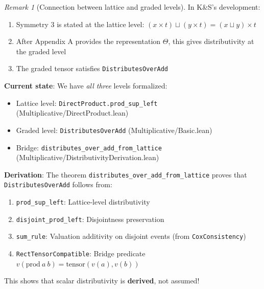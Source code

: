 \documentclass[11pt]{article}
\theoremstyle{definition}
\theoremstyle{remark}
\newtheorem{remark}[theorem]{Remark}
\begin{document}
\begin{remark}[Connection between lattice and graded levels]
In K\&S's development:
\begin{enumerate}
\item Symmetry 3 is stated at the lattice level: $(x \times t) \sqcup (y \times t) = (x \sqcup y) \times t$
\item After Appendix A provides the representation $\Theta$, this gives distributivity at the graded level
\item The graded tensor satisfies \texttt{DistributesOverAdd}
\end{enumerate}

\textbf{Current state}: We have \emph{all three} levels formalized:
\begin{itemize}
\item Lattice level: \texttt{DirectProduct.prod\_sup\_left} (Multiplicative/DirectProduct.lean)
\item Graded level: \texttt{DistributesOverAdd} (Multiplicative/Basic.lean)
\item Bridge: \texttt{distributes\_over\_add\_from\_lattice} (Multiplicative/DistributivityDerivation.lean)
\end{itemize}

\textbf{Derivation}: The theorem \texttt{distributes\_over\_add\_from\_lattice} proves that
\texttt{DistributesOverAdd} follows from:
\begin{enumerate}
\item \texttt{prod\_sup\_left}: Lattice-level distributivity
\item \texttt{disjoint\_prod\_left}: Disjointness preservation
\item \texttt{sum\_rule}: Valuation additivity on disjoint events (from \texttt{CoxConsistency})
\item \texttt{RectTensorCompatible}: Bridge predicate $v(\text{prod}\ a\ b) = \text{tensor}(v(a), v(b))$
\end{enumerate}
This shows that scalar distributivity is \textbf{derived}, not assumed!
\end{remark}
\end{document}

